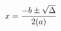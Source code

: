 \documentclass[preview]{standalone}
\begin{document}
\begin{align*}
\special{dvisvgm:raw <g id='unique000'>}x=\frac{-b\pm\sqrt{\Delta}}{2(a)}\special{dvisvgm:raw </g>}
\end{align*}
\end{document}
